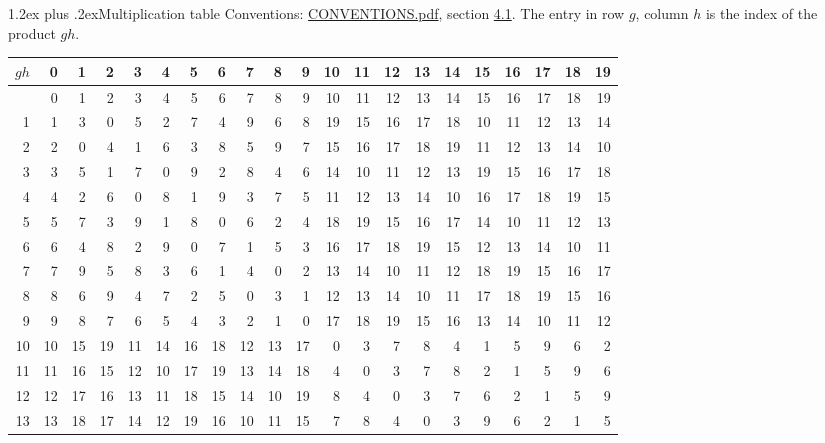 \documentclass[10pt,a4paper]{article}
\makeatletter
\renewcommand\section{\@startsection{section}{1}{\z@}{-3ex plus -1ex minus -.2ex}%
  {1.2ex plus .2ex}{\normalfont\large\sffamily\bfseries\color{parttitle}}}
\numberwithin{equation}{section}
\makeatother
\begin{document}
\section{Multiplication table}\label{s:multiplication}
Conventions: \href{../../CONVENTIONS.pdf}{CONVENTIONS.pdf}, section \href{../../CONVENTIONS.pdf\#conv.4.1}{4.1}.
The entry in row $g$, column $h$ is the index of the product $gh$.
{\normalsize\setlength{\tabcolsep}{0.1em}\setlength{\LTleft}{-8pt plus 1fill}\setlength{\LTright}{-8pt plus 1fill}\begin{longtable}{@{}r|rrrrrrrrrrrrrrrrrrrr@{}}\toprule
$gh$ & 0 & 1 & 2 & 3 & 4 & 5 & 6 & 7 & 8 & 9 & 10 & 11 & 12 & 13 & 14 & 15 & 16 & 17 & 18 & 19\\\midrule\endhead
\bottomrule\endfoot\endlastfoot
0 & 0 & 1 & 2 & 3 & 4 & 5 & 6 & 7 & 8 & 9 & 10 & 11 & 12 & 13 & 14 & 15 & 16 & 17 & 18 & 19\\*
1 & 1 & 3 & 0 & 5 & 2 & 7 & 4 & 9 & 6 & 8 & 19 & 15 & 16 & 17 & 18 & 10 & 11 & 12 & 13 & 14\\
2 & 2 & 0 & 4 & 1 & 6 & 3 & 8 & 5 & 9 & 7 & 15 & 16 & 17 & 18 & 19 & 11 & 12 & 13 & 14 & 10\\
3 & 3 & 5 & 1 & 7 & 0 & 9 & 2 & 8 & 4 & 6 & 14 & 10 & 11 & 12 & 13 & 19 & 15 & 16 & 17 & 18\\
4 & 4 & 2 & 6 & 0 & 8 & 1 & 9 & 3 & 7 & 5 & 11 & 12 & 13 & 14 & 10 & 16 & 17 & 18 & 19 & 15\\
5 & 5 & 7 & 3 & 9 & 1 & 8 & 0 & 6 & 2 & 4 & 18 & 19 & 15 & 16 & 17 & 14 & 10 & 11 & 12 & 13\\
6 & 6 & 4 & 8 & 2 & 9 & 0 & 7 & 1 & 5 & 3 & 16 & 17 & 18 & 19 & 15 & 12 & 13 & 14 & 10 & 11\\
7 & 7 & 9 & 5 & 8 & 3 & 6 & 1 & 4 & 0 & 2 & 13 & 14 & 10 & 11 & 12 & 18 & 19 & 15 & 16 & 17\\
8 & 8 & 6 & 9 & 4 & 7 & 2 & 5 & 0 & 3 & 1 & 12 & 13 & 14 & 10 & 11 & 17 & 18 & 19 & 15 & 16\\
9 & 9 & 8 & 7 & 6 & 5 & 4 & 3 & 2 & 1 & 0 & 17 & 18 & 19 & 15 & 16 & 13 & 14 & 10 & 11 & 12\\
10 & 10 & 15 & 19 & 11 & 14 & 16 & 18 & 12 & 13 & 17 & 0 & 3 & 7 & 8 & 4 & 1 & 5 & 9 & 6 & 2\\
11 & 11 & 16 & 15 & 12 & 10 & 17 & 19 & 13 & 14 & 18 & 4 & 0 & 3 & 7 & 8 & 2 & 1 & 5 & 9 & 6\\
12 & 12 & 17 & 16 & 13 & 11 & 18 & 15 & 14 & 10 & 19 & 8 & 4 & 0 & 3 & 7 & 6 & 2 & 1 & 5 & 9\\
13 & 13 & 18 & 17 & 14 & 12 & 19 & 16 & 10 & 11 & 15 & 7 & 8 & 4 & 0 & 3 & 9 & 6 & 2 & 1 & 5\\

\end{longtable}}
\end{document}
